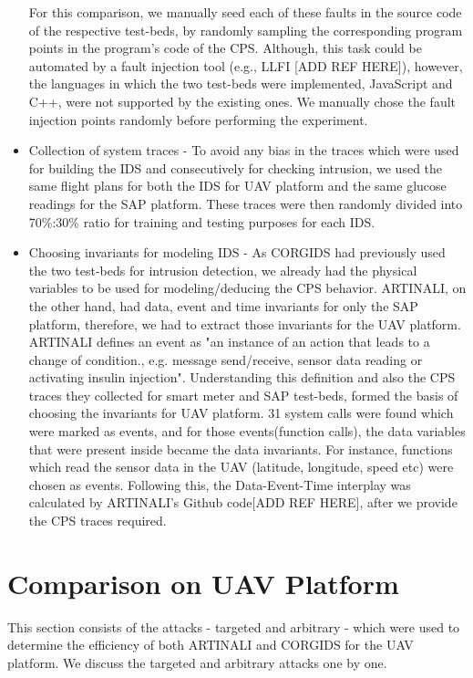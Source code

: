 \begin{itemize}
For this comparison, we manually seed each of these faults in the source code of the respective test-beds, by randomly sampling the corresponding program points in the program’s code of the \ac{CPS}. Although, this task could be automated by a fault injection tool (e.g., LLFI [ADD REF HERE]), however, the languages in which the two test-beds were implemented, JavaScript and C++, were not supported by the existing ones. We manually chose the fault injection points randomly before performing the experiment.

\item Collection of system traces - To avoid any bias in the traces which were used for building the IDS and consecutively for checking intrusion, we used the same flight plans for both the IDS for UAV platform and the same glucose readings for the SAP platform. These traces were then randomly divided into 70\%:30\% ratio for training and testing purposes for each IDS.

\item Choosing invariants for modeling IDS - As CORGIDS had previously used the two test-beds for intrusion detection, we already had the physical variables to be used for modeling/deducing the CPS behavior. ARTINALI, on the other hand, had data, event and time invariants for only the SAP platform, therefore, we had to extract those invariants for the UAV platform. ARTINALI defines an event as "an instance of an action that leads to a change of condition., e.g. message send/receive, sensor data reading or activating insulin injection". Understanding this definition and also the CPS traces they collected for smart meter and SAP test-beds, formed the basis of choosing the invariants for UAV platform. 31 system calls were found which were marked as events, and for those events(function calls), the data variables that were present inside became the data invariants. For instance, functions which read the sensor data in the UAV (latitude, longitude, speed etc) were chosen as events. Following this, the Data-Event-Time interplay was calculated by ARTINALI's Github code[ADD REF HERE], after we provide the CPS traces required.
\end{itemize}

\section{Comparison on UAV Platform}
This section consists of the attacks - targeted and arbitrary - which were used to determine the efficiency of both ARTINALI and CORGIDS for the UAV platform. We discuss the targeted and arbitrary attacks one by one.


